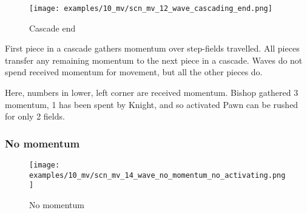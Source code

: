 \vspace*{-2.1\baselineskip}
\noindent
\begin{figure}[h]
\texttt{[image: examples/10\_mv/scn\_mv\_12\_wave\_cascading\_end.png]}
\caption{Cascade end}
\label{fig:scn_mv_12_wave_cascading_end}
\end{figure}

First piece in a cascade gathers momentum over step-fields travelled. All pieces
transfer any remaining momentum to the next piece in a cascade. Waves do not spend
received momentum for movement, but all the other pieces do.

Here, numbers in lower, left corner are received momentum. Bishop gathered 3 momentum,
1 has been spent by Knight, and so activated Pawn can be rushed for only 2 fields.





\clearpage %

\subsubsection*{No momentum}

\vspace*{-1.4\baselineskip}
\noindent
\begin{figure}[h]
\texttt{[image: examples/10\_mv/scn\_mv\_14\_wave\_no\_momentum\_no\_activating.png]}
\caption{No momentum}
\label{fig:scn_mv_14_wave_no_momentum_no_activating}
\end{figure}

